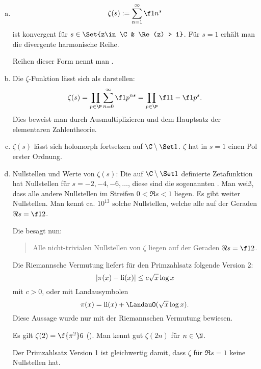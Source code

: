 \begin{nt} \label{7.11}
	\begin{enumerate}[a)]
		\item
			\[
				\zeta(s) := \sum_{n=1}^\infty \f 1{n^s}
			\]
			ist konvergent für $s \in \Set{z\in \C & \Re(z) > 1}$.
			Für $s = 1$ erhält man die divergente harmonische Reihe.

			Reihen dieser Form nennt man .
		\item
			Die $\zeta$-Funktion lässt sich als  darstellen:
			\[
				\zeta(s)
				= \prod_{p\in\P} \sum_{n=0}^\infty \f 1{p^{ns}}
				= \prod_{p\in\P} \f 1{1 - \f 1{p^s}}.
			\]
			Dies beweist man durch Ausmultiplizieren und dem Hauptsatz der elementaren Zahlentheorie.
		\item
			$\zeta(s)$ lässt sich holomorph fortsetzen auf $\C \setminus \Set 1$.
			$\zeta$ hat in $s = 1$ einen Pol erster Ordnung.
		\item
			Nullstellen und Werte von $\zeta(s)$:
			Die auf $\C \setminus \Set 1$ definierte Zetafunktion hat Nullstellen für $s = -2, -4, -6, \dotsc$,
			diese sind die sogenannten .
			Man weiß, dass alle andere Nullstellen im Streifen $0 < \Re s < 1$ liegen.
			Es gibt weiter Nullstellen.
			Man kennt ca. $10^{13}$ solche Nullstellen, welche alle auf der Geraden $\Re s = \f 12$.

			Die  besagt nun:
			\begin{quote}
				Alle nicht-trivialen Nullstellen von $\zeta$ liegen auf der Geraden $\Re s = \f 12$.
			\end{quote}

			Die Riemannsche Vermutung liefert für den Primzahlsatz folgende Version 2:
			\[
				|\pi(x) - \operatorname{li}(x)|
				\le c \sqrt x \log x
			\]
			mit $c > 0$, oder mit Landausymbolen
			\[
				\pi(x) = \li(x) + \LandauO(\sqrt x \log x).
			\]
			Diese Aussage wurde nur mit der Riemannschen Vermutung bewiesen.

			Es gilt $\zeta(2) = \f{\pi^2}6$ ().
			Man kennt gut $\zeta(2n)$ für $n \in \N$.

			Der Primzahlsatz Version 1 ist gleichwertig damit, dass $\zeta$ für $\Re s = 1$ keine Nullstellen hat.
	\end{enumerate}
\end{nt}
